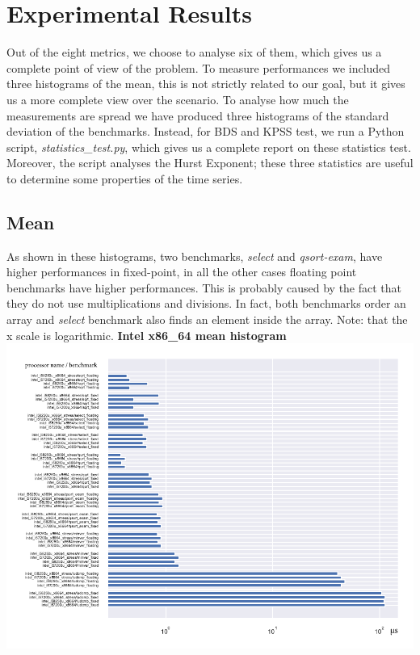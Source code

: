 \clearpage

\section{Experimental Results}

Out of the eight metrics, we choose to analyse six of them, which gives us a complete point of view of the problem.
To measure performances we included three histograms of the mean, this is not strictly related to our goal, but it gives us a more complete view over the scenario.
To analyse how much the measurements are spread we have produced three histograms of the standard deviation of the benchmarks.
Instead, for BDS and KPSS test, we run a Python script, \textit{statistics\_test.py}, which gives us a complete report on these statistics test. Moreover, the script analyses the Hurst Exponent; these three statistics are useful to determine some properties of the time series.
\clearpage
\subsection{Mean}

As shown in these histograms, two benchmarks, \textit{select} and \textit{qsort-exam}, have higher performances in fixed-point, in all the other cases floating point benchmarks have higher performances. This is probably caused by the fact that they do not use multiplications and divisions. In fact, both benchmarks order an array and \textit{select} benchmark also finds an element inside the array.\newline
Note: that the x scale is logarithmic. \newline
\textbf{Intel x86\_64 mean histogram}\newline
\hspace*{-3.2cm}
\includegraphics[width=565pt]{intel_mean_histogram.pdf}
\clearpage

